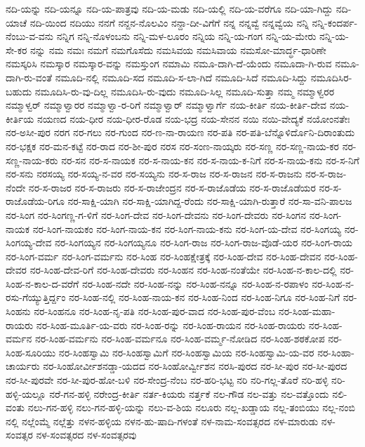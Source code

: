 ನದಿ-ಯನ್ನು
ನದಿ-ಯನ್ನೂ
ನದಿ-ಯ-ಪಾತ್ರವು
ನದಿ-ಯ-ಮಡು
ನದಿ-ಯಲ್ಲಿ
ನದಿ-ಯ-ವರೆಗೂ
ನದಿ-ಯಾ-ಗಿದ್ದು
ನದಿ-ಯಾಚೆ
ನದಿ-ಯಿಂದ
ನದಿಯು
ನನಗೆ
ನನ್ದನ-ನೊಲವಿಂ
ನನ್ದಾ-ದೀ-ವಿಗೆಗೆ
ನನ್ನ
ನನ್ನವ್ವೆ
ನನ್ನವ್ವೆಯ
ನನ್ನಿ
ನನ್ನಿ-ಕಂದರ್ಪ-ನೆಂಬು-ವ-ವನು
ನನ್ನಿಗ
ನನ್ನಿ-ನೊಳಂಬನು
ನನ್ನಿ-ಮಳ-ಲೂರಂ
ನನ್ನಿಯ
ನನ್ನಿ-ಯ-ಗಂಗ
ನನ್ನಿ-ಯ-ಮೇರು
ನನ್ನಿ-ಯ-ಸೇ-ಕರ
ನನ್ನು
ನಮ
ನಮಃ
ನಮಗೆ
ನಮಗೊಸೆದು
ನಮಸಿವಯ
ನಮಸಿವಾಯ
ನಮಸೋ-ಮಾರ್ದ್ಧ-ಧಾರಿಣೇ
ನಮಸ್ಕರಿಸಿ
ನಮಸ್ಕಾರ
ನಮಸ್ಕಾರ-ವನ್ನು
ನಮಸ್ತುಂಗ
ನಮಾಮಿ
ನಮೂ-ದಾಗಿ-ದೆ-ಯೆಂದು
ನಮೂದಾ-ಗಿ-ರುವ
ನಮೂ-ದಾಗಿ-ರು-ವಂತೆ
ನಮೂದಿ-ನಲ್ಲಿ
ನಮೂದಿ-ಸದ
ನಮೂದಿ-ಸ-ಲಾ-ಗಿದೆ
ನಮೂದಿ-ಸಿದೆ
ನಮೂದಿ-ಸಿದ್ದು
ನಮೂದಿಸಿರ-ಬಹುದು
ನಮೂದಿಸಿ-ರು-ವು-ದಿಲ್ಲ
ನಮೂದಿಸಿ-ರು-ವುದು
ನಮೂದಿ-ಸಿಲ್ಲ
ನಮೂದಿ-ಸುತ್ತಾ
ನಮ್ಮ
ನಮ್ಮಾಳ್ವರರ
ನಮ್ಮಾಳ್ವರ್
ನಮ್ಮಾಳ್ವಾರರ
ನಮ್ಮಾಳ್ವಾ-ರ-ರಿಗೆ
ನಮ್ಮಾಳ್ವಾರ್
ನಮ್ಮಾಳ್ವಾರ್ಗೆ
ನಯ-ಕೀರ್ತಿ
ನಯ-ಕೀರ್ತಿ-ದೇವ
ನಯ-ಕೀರ್ತಿಯ
ನಯಣದ
ನಯ-ಧೀರ
ನಯ-ಧೀರ-ರೊಡ
ನಯ-ಭದ್ರ
ನಯ-ಸೇನನ
ನಯಿ
ನಯಿ-ವೇದ್ಯಕೆ
ನಯೋಂನತೇಃ
ನರ-ಅಸೀ-ಪುರ
ನರಗ
ನರ-ಗಲು
ನರ-ಗುಂದ
ನರ-ಣ-ನಾ-ರಾಯಣ
ನರ-ಪತಿ
ನರ-ಪತಿ-ಬೆನ್ನೊಳಿರ್ದೊನಿ-ದಿರಾಂತುದು
ನರ-ಭಕ್ಷಕ
ನರ-ಮನ-ಕಟ್ಟೆ
ನರ-ರಾದ
ನರ-ಶೀ-ಪುರ
ನರಸ
ನರ-ಸಂಣ-ನಾಯ್ಕರು
ನರ-ಸಣ್ಣ
ನರ-ಸಣ್ಣ-ನಾಯ-ಕರ
ನರ-ಸಣ್ಣ-ನಾಯ-ಕರು
ನರ-ಸನ
ನರ-ಸ-ನಾಯಕ
ನರ-ಸ-ನಾಯ-ಕನ
ನರ-ಸ-ನಾಯ-ಕ-ನಿಗೆ
ನರ-ಸ-ನಾಯ-ಕನು
ನರ-ಸ-ನಿಗೆ
ನರ-ಸನು
ನರಸಯ್ಯ
ನರ-ಸಯ್ಯ-ನ-ವರ
ನರ-ಸಯ್ಯನು
ನರ-ಸ-ರಾಜ
ನರ-ಸ-ರಾಜನ
ನರ-ಸ-ರಾಜನು
ನರ-ಸ-ರಾಜ-ನೆಂದೇ
ನರ-ಸ-ರಾಜರ
ನರ-ಸ-ರಾಜರು
ನರ-ಸ-ರಾಜೇಂದ್ರನ
ನರ-ಸ-ರಾಜೊಡೆಯ
ನರ-ಸ-ರಾಜೊಡೆಯರ
ನರ-ಸ-ರಾಜೊಡೆಯ-ರಿಗೂ
ನರ-ಸಾಕ್ಷಿ-ಯಾಗಿ
ನರ-ಸಾಕ್ಷಿ-ಯಾಗಿದ್ದ-ರೆಂದು
ನರ-ಸಾಕ್ಷಿ-ಯಾಗಿ-ರುತ್ತಾರೆ
ನರ-ಸಾ-ವನಿ-ಪಾಲಜ
ನರ-ಸಿಂಗ
ನರ-ಸಿಂಗಣ್ಣ-ಗ-ಳಿಗೆ
ನರ-ಸಿಂಗ-ದೇವ
ನರ-ಸಿಂಗ-ದೇವನು
ನರ-ಸಿಂಗ-ದೇವರು
ನರ-ಸಿಂಗನ
ನರ-ಸಿಂಗ-ನಾಯಕ
ನರ-ಸಿಂಗ-ನಾಯಕಂ
ನರ-ಸಿಂಗ-ನಾಯ-ಕನ
ನರ-ಸಿಂಗ-ನಾಯ-ಕನು
ನರ-ಸಿಂಗ-ಯ-ದೇವ
ನರ-ಸಿಂಗಯ್ಯ
ನರ-ಸಿಂಗಯ್ಯ-ದೇವ
ನರ-ಸಿಂಗಯ್ಯನ
ನರ-ಸಿಂಗಯ್ಯನೂ
ನರ-ಸಿಂಗ-ರಾಜ
ನರ-ಸಿಂಗ-ರಾಜ-ವೊಡೆ-ಯರ
ನರ-ಸಿಂಗ-ರಾಯ
ನರ-ಸಿಂಗ-ವರ್ಮ
ನರ-ಸಿಂಗ-ವರ್ಮನು
ನರ-ಸಿಂಹ
ನರ-ಸಿಂಹಕ್ಷೇತ್ರಕ್ಕೆ
ನರ-ಸಿಂಹ-ದೇವ
ನರ-ಸಿಂಹ-ದೇವನ
ನರ-ಸಿಂಹ-ದೇವರ
ನರ-ಸಿಂಹ-ದೇವ-ರಿಗೆ
ನರ-ಸಿಂಹ-ದೇವರು
ನರ-ಸಿಂಹನ
ನರ-ಸಿಂಹ-ನಂತೆಯೇ
ನರ-ಸಿಂಹ-ನ-ಕಾಲ-ದಲ್ಲಿ
ನರ-ಸಿಂಹ-ನ-ಕಾಲ-ದ-ವರೆಗೆ
ನರ-ಸಿಂಹ-ನದೇ
ನರ-ಸಿಂಹ-ನನ್ನು
ನರ-ಸಿಂಹ-ನನ್ನೂ
ನರ-ಸಿಂಹ-ನ-ರಪಾಳಂ
ನರ-ಸಿಂಹ-ನ-ರಸು-ಗೆಯ್ಯುತ್ತಿರ್ದ್ದಂ
ನರ-ಸಿಂಹ-ನಲ್ಲಿ
ನರ-ಸಿಂಹ-ನಾಯ-ಕನ
ನರ-ಸಿಂಹ-ನಿಂದ
ನರ-ಸಿಂಹ-ನಿಗೂ
ನರ-ಸಿಂಹ-ನಿಗೆ
ನರ-ಸಿಂಹನು
ನರ-ಸಿಂಹನೂ
ನರ-ಸಿಂಹ-ನೃ-ಪತಿ
ನರ-ಸಿಂಹ-ಪುರ-ವಾದ
ನರ-ಸಿಂಹ-ಪುರ-ವೆಂಬ
ನರ-ಸಿಂಹ-ಮಹಾ-ರಾಯರು
ನರ-ಸಿಂಹ-ಮೂರ್ತಿ-ಯ-ವರು
ನರ-ಸಿಂಹ-ರನ್ನು
ನರ-ಸಿಂಹ-ರಾಯನ
ನರ-ಸಿಂಹ-ರಾಯರು
ನರ-ಸಿಂಹ-ವರ್ಮನ
ನರ-ಸಿಂಹ-ವರ್ಮನು
ನರ-ಸಿಂಹ-ವರ್ಮನೂ
ನರ-ಸಿಂಹ-ವರ್ಮ್ಮ-ನೋಡಿದ
ನರ-ಸಿಂಹ-ಶಠಕೋಪ
ನರ-ಸಿಂಹ-ಸೂರಿಯು
ನರ-ಸಿಂಹಸ್ವಾಮಿ
ನರ-ಸಿಂಹಸ್ವಾಮಿಗೆ
ನರ-ಸಿಂಹಸ್ವಾಮಿಯ
ನರ-ಸಿಂಹಸ್ವಾಮಿ-ಯ-ವರ
ನರ-ಸಿಂಹಾ-ಚಾರ್ಯರು
ನರ-ಸಿಂಹೋರ್ವೀಶನಡ್ಡಾ-ಯದದ
ನರ-ಸಿಂಹೋರ್ವ್ವೀಶನ
ನರಸಿ-ಪುರದ
ನರ-ಸೀ-ಪುರ
ನರ-ಸೀ-ಪುರದ
ನರ-ಸೀ-ಪುರವೇ
ನರ-ಸೀ-ಪುರ-ಹೋ-ಬಳಿ
ನರ-ಸೇಂದ್ರ-ನೆಂಬ
ನರ-ಹರಿ-ಭಟ್ಟ
ನರಿ
ನರಿ-ಗಲ್ಲ-ತೊರೆ
ನರಿ-ಹಳ್ಳಿ
ನರಿ-ಹಳ್ಳಿ-ಯಲ್ಲೂ
ನರೆ-ಗನ-ಹಳ್ಳಿ
ನರೇಂದ್ರ-ಕೀರ್ತಿ
ನರ್ತ-ಕಿಯರು
ನರ್ತ್ತಕೆ
ನಲ-ಗೌಡ
ನಲ-ವತ್ತು
ನಲ-ವತ್ತೊಂದು
ನಲಿ-ವಂತು
ನಲು-ಗನ-ಹಳ್ಳಿ
ನಲು-ಗನ-ಹಳ್ಳಿ-ಯನ್ನು
ನಲು-ವ-ಶಿಯ
ನಲೂರು
ನಲ್ಲ-ಖಡ್ಡಾಯ
ನಲ್ಲ-ತಂಬಿಯು
ನಲ್ಲ-ನಂಬಿ
ನಲ್ಲಿ
ನಲ್ಲೆಂಮ್ಮೆ
ನಲ್ಲೆತ್ತು
ನಳನ-ಹಳ್ಳಿಯ
ನಳನ-ಹು-ಷಾದಿ-ಗಳಂತೆ
ನಳ-ನಾಮ-ಸಂವತ್ಸರದ
ನಳ-ಮಾರುಡು
ನಳ-ಸಂವತ್ಸರ
ನಳ-ಸಂವತ್ಸರದ
ನಳ-ಸಂವತ್ಸರವು
